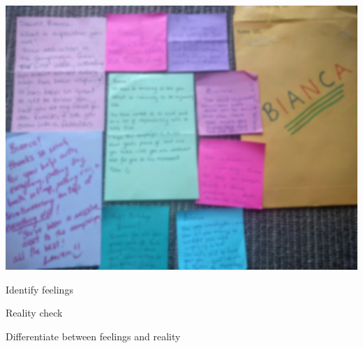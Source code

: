 \documentclass[aspectratio=169]{beamer}
\begin{document}
\begin{frame}
  \begin{center}
    \includegraphics[scale=.07]{./assets/IMG_20160809_162050.jpg}
  \end{center}
\end{frame}

\begin{frame}
  \begin{center}
    \Huge Identify feelings
    \\ \small \cite{caltech}
  \end{center}
\end{frame}

\begin{frame}
  \begin{center}
    \Huge Reality check
    \\ \small \cite{caltech}
  \end{center}
\end{frame}

\begin{frame}
  \begin{center}
    \Huge Differentiate between feelings and reality
    \\ \small \cite{caltech}
  \end{center}
\end{frame}
\end{document}
